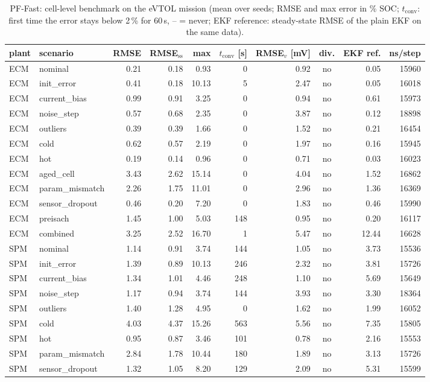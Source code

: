 \begin{table}[H]\centering\footnotesize\setlength{\tabcolsep}{4pt}
\caption{PF-Fast: cell-level benchmark on the eVTOL mission (mean over seeds; RMSE and max error in \% SOC; $t_\mathrm{conv}$: first time the error stays below 2\,\% for 60\,s, -- = never; EKF reference: steady-state RMSE of the plain EKF on the same data).}\label{tab:cell_PFFast}
\begin{tabular}{llrrrrrcrr}\toprule
plant & scenario & RMSE & RMSE$_\mathrm{ss}$ & max & $t_\mathrm{conv}$ [s] & RMSE$_v$ [mV] & div. & EKF ref. & ns/step \\ \midrule
ECM & nominal & 0.21 & 0.18 & 0.93 & 0 & 0.92 & no & 0.05 & 15960 \\
ECM & init\_error & 0.41 & 0.18 & 10.13 & 5 & 2.47 & no & 0.05 & 16018 \\
ECM & current\_bias & 0.99 & 0.91 & 3.25 & 0 & 0.94 & no & 0.61 & 15973 \\
ECM & noise\_step & 0.57 & 0.68 & 2.35 & 0 & 3.87 & no & 0.12 & 18898 \\
ECM & outliers & 0.39 & 0.39 & 1.66 & 0 & 1.52 & no & 0.21 & 16454 \\
ECM & cold & 0.62 & 0.57 & 2.19 & 0 & 1.97 & no & 0.16 & 15945 \\
ECM & hot & 0.19 & 0.14 & 0.96 & 0 & 0.71 & no & 0.03 & 16023 \\
ECM & aged\_cell & 3.43 & 2.62 & 15.14 & 0 & 4.04 & no & 1.52 & 16862 \\
ECM & param\_mismatch & 2.26 & 1.75 & 11.01 & 0 & 2.96 & no & 1.36 & 16369 \\
ECM & sensor\_dropout & 0.46 & 0.20 & 7.20 & 0 & 1.83 & no & 0.46 & 15990 \\
ECM & preisach & 1.45 & 1.00 & 5.03 & 148 & 0.95 & no & 0.20 & 16117 \\
ECM & combined & 3.25 & 2.52 & 16.70 & 1 & 5.47 & no & 12.44 & 16628 \\
\midrule
SPM & nominal & 1.14 & 0.91 & 3.74 & 144 & 1.05 & no & 3.73 & 15536 \\
SPM & init\_error & 1.39 & 0.89 & 10.13 & 246 & 2.32 & no & 3.81 & 15726 \\
SPM & current\_bias & 1.34 & 1.01 & 4.46 & 248 & 1.10 & no & 5.69 & 15649 \\
SPM & noise\_step & 1.17 & 0.94 & 3.74 & 144 & 3.93 & no & 3.30 & 18364 \\
SPM & outliers & 1.40 & 1.28 & 4.95 & 0 & 1.62 & no & 1.99 & 16052 \\
SPM & cold & 4.03 & 4.37 & 15.26 & 563 & 5.56 & no & 7.35 & 15805 \\
SPM & hot & 0.95 & 0.87 & 3.46 & 101 & 0.78 & no & 2.16 & 15553 \\
SPM & param\_mismatch & 2.84 & 1.78 & 10.44 & 180 & 1.89 & no & 3.13 & 15726 \\
SPM & sensor\_dropout & 1.32 & 1.05 & 8.20 & 129 & 2.09 & no & 5.31 & 15599 \\
\bottomrule\end{tabular}\end{table}
